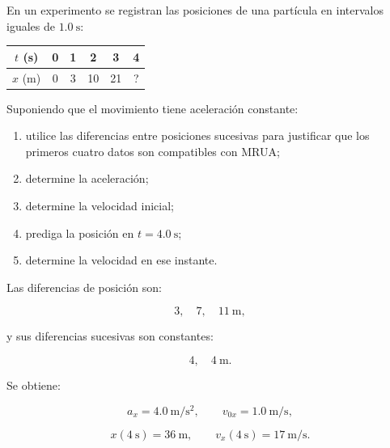 \begin{ejercicio}
En un experimento se registran las posiciones de una partícula en intervalos iguales de \(\SI{1.0}{\second}\):

\begin{center}
\begin{tabular}{c|ccccc}
\toprule
\(t\) (\si{\second}) & 0 & 1 & 2 & 3 & 4 \\
\midrule
\(x\) (\si{\meter}) & 0 & 3 & 10 & 21 & ? \\
\bottomrule
\end{tabular}
\end{center}

Suponiendo que el movimiento tiene aceleración constante:

\begin{enumerate}[label=\alph*)]
    \item utilice las diferencias entre posiciones sucesivas para justificar que los primeros cuatro datos son compatibles con MRUA;
    \item determine la aceleración;
    \item determine la velocidad inicial;
    \item prediga la posición en \(t=\SI{4.0}{\second}\);
    \item determine la velocidad en ese instante.
\end{enumerate}
\end{ejercicio}

\begin{respuesta}
Las diferencias de posición son:

\[
3,\quad 7,\quad 11\ \si{\meter},
\]

y sus diferencias sucesivas son constantes:

\[
4,\quad4\ \si{\meter}.
\]

Se obtiene:

\[
a_x=\SI{4.0}{\meter\per\second\squared},
\qquad
v_{0x}=\SI{1.0}{\meter\per\second},
\]

\[
x(\SI{4}{\second})=\SI{36}{\meter},
\qquad
v_x(\SI{4}{\second})=\SI{17}{\meter\per\second}.
\]
\end{respuesta}

